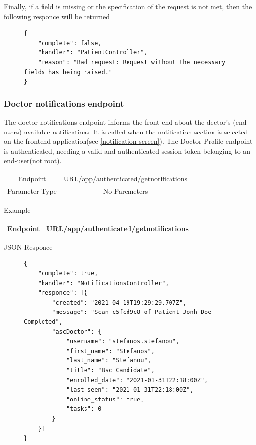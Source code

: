 					Finally, if a field is missing or the specification of the request is not met, then the following responce will be returned
					\begin{figure}[H]
						\iftrue
						\begin{lstlisting}[]
{
	"complete": false,
	"handler": "PatientController",
	"reason": "Bad request: Request without the necessary fields has being raised."
}					
						\end{lstlisting}
					\end{figure}
				\subsubsection{Doctor notifications endpoint}
				
					The doctor notifications endpoint informs the front end about the doctor's (end-users) available notifications.  
					It is called when the notification section is selected on the frontend application(see \ref{notification-screen}).  
					The Doctor Profile endpoint is authenticated, needing a valid and authenticated session token belonging to an 
					end-user(not root).
					\begin{center}
						\begin{tabular}{ |c|c| } 
							\hline
							Endpoint & {{URL}}/app/authenticated/getnotifications\\
							Parameter Type & No Paremeters  \\
							\hline
						\end{tabular}
					\end{center}
					Example
					\begin{center}
						\begin{tabular}{ |c|c| } 
							\hline
							Endpoint & {{URL}}/app/authenticated/getnotifications\\
							\hline
						\end{tabular}
					\end{center}
					JSON Responce
					\begin{figure}[H]
						\iftrue
						\begin{lstlisting}[]
{
	"complete": true,
	"handler": "NotificationsController",
	"responce": [{
		"created": "2021-04-19T19:29:29.707Z",
		"message": "Scan c5fcd9c8 of Patient Jonh Doe Completed",
		"ascDoctor": {
			"username": "stefanos.stefanou",
			"first_name": "Stefanos",
			"last_name": "Stefanou",
			"title": "Bsc Candidate",
			"enrolled_date": "2021-01-31T22:18:00Z",
			"last_seen": "2021-01-31T22:18:00Z",
			"online_status": true,
			"tasks": 0
		}
	}]
}
						\end{lstlisting}
					\end{figure}
